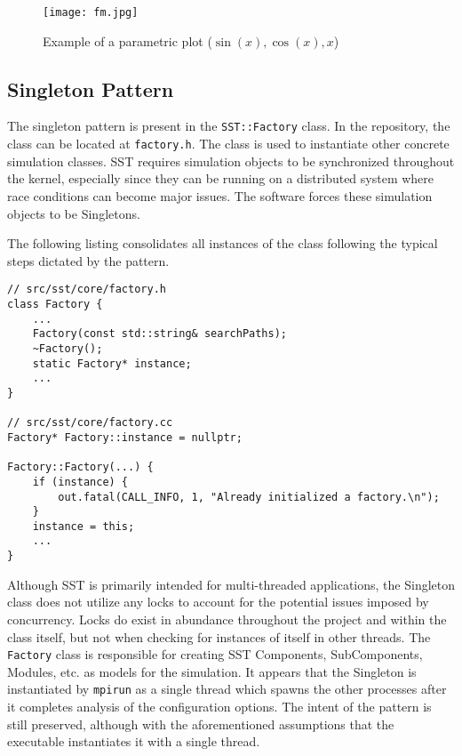 \begin{figure}[h]
    \caption{Example of a parametric plot ($\sin (x), \cos(x), x$)}
    \centering
    \texttt{[image: fm.jpg]}
\end{figure}


\subsection{Singleton Pattern}
The singleton pattern is present in the \texttt{SST::Factory} class. In the repository, the class can be located at \texttt{factory.h}. The class is used to instantiate other concrete simulation classes. SST requires simulation objects to be synchronized throughout the kernel, especially since they can be running on a distributed system where race conditions can become major issues. The software forces these simulation objects to be Singletons.

The following listing consolidates all instances of the class following the typical steps dictated by the pattern.

\begin{lstlisting}[style=customC++,label=singleton,caption=Factory Implementing the Singleton Pattern]
// src/sst/core/factory.h
class Factory {
    ...
    Factory(const std::string& searchPaths);
    ~Factory();
    static Factory* instance;
    ...
}

// src/sst/core/factory.cc
Factory* Factory::instance = nullptr;

Factory::Factory(...) {
    if (instance) {
        out.fatal(CALL_INFO, 1, "Already initialized a factory.\n");
    }
    instance = this;
    ...
}
\end{lstlisting}

Although SST is primarily intended for multi-threaded applications, the Singleton class does not utilize any locks to account for the potential issues imposed by concurrency. Locks do exist in abundance throughout the project and within the class itself, but not when checking for instances of itself in other threads. The \texttt{Factory} class is responsible for creating SST Components, SubComponents, Modules, etc. as models for the simulation. It appears that the Singleton is instantiated by \texttt{mpirun} as a single thread which spawns the other processes after it completes analysis of the configuration options. The intent of the pattern is still preserved, although with the aforementioned assumptions that the executable instantiates it with a single thread.

